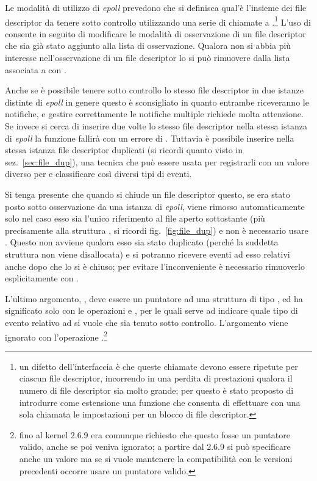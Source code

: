Le modalità di utilizzo di \textit{epoll} prevedono che si definisca qual'è
l'insieme dei file descriptor da tenere sotto controllo utilizzando una serie
di chiamate a .\footnote{un difetto dell'interfaccia è
  che queste chiamate devono essere ripetute per ciascun file descriptor,
  incorrendo in una perdita di prestazioni qualora il numero di file
  descriptor sia molto grande; per questo è stato proposto di introdurre come
  estensione una funzione  che consenta di effettuare con
  una sola chiamata le impostazioni per un blocco di file descriptor.} L'uso
di  consente in seguito di modificare le modalità di
osservazione di un file descriptor che sia già stato aggiunto alla lista di
osservazione. Qualora non si abbia più interesse nell'osservazione di un file
descriptor lo si può rimuovere dalla lista associata a  con
.

Anche se è possibile tenere sotto controllo lo stesso file descriptor in due
istanze distinte di \textit{epoll} in genere questo è sconsigliato in quanto
entrambe riceveranno le notifiche, e gestire correttamente le notifiche
multiple richiede molta attenzione. Se invece si cerca di inserire due volte
lo stesso file descriptor nella stessa istanza di \textit{epoll} la funzione
fallirà con un errore di .  Tuttavia è possibile inserire nella
stessa istanza file descriptor duplicati (si ricordi quanto visto in
sez.~\ref{sec:file_dup}), una tecnica che può essere usata per registrarli con
un valore diverso per  e classificare così diversi tipi di
eventi.

Si tenga presente che quando si chiude un file descriptor questo, se era stato
posto sotto osservazione da una istanza di \textit{epoll}, viene rimosso
automaticamente solo nel caso esso sia l'unico riferimento al file aperto
sottostante (più precisamente alla struttura , si ricordi
fig.~\ref{fig:file_dup}) e non è necessario usare
. Questo non avviene qualora esso sia stato duplicato
(perché la suddetta struttura non viene disallocata) e si potranno ricevere
eventi ad esso relativi anche dopo che lo si è chiuso; per evitare
l'inconveniente è necessario rimuoverlo esplicitamente con
.

L'ultimo argomento, , deve essere un puntatore ad una struttura
di tipo , ed ha significato solo con le operazioni
 e , per le quali serve ad
indicare quale tipo di evento relativo ad  si vuole che sia tenuto
sotto controllo.  L'argomento viene ignorato con l'operazione
.\footnote{fino al kernel 2.6.9 era comunque richiesto
  che questo fosse un puntatore valido, anche se poi veniva ignorato; a
  partire dal 2.6.9 si può specificare anche un valore  ma se si
  vuole mantenere la compatibilità con le versioni precedenti occorre usare un
  puntatore valido.}

